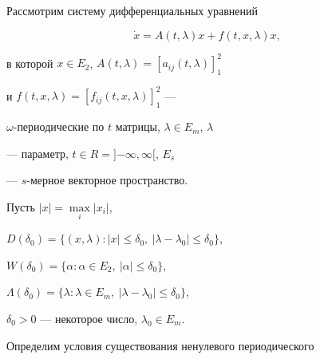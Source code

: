 \date{}




\pagestyle{plain} %







\maketitle


\label{begin}








Рассмотрим систему дифференциальных уравнений


\begin{equation}


\label{1}


\Dot x=A(t,\lambda)x+f(t,x,\lambda)x,


\end{equation}


в которой $x \in E_2$, $A(t,\lambda)


=\left[{a_{ij} (t,\lambda)} \right]_1^2$


и $f(t,x,\lambda)=\left[{f_{ij} (t,x,\lambda)} \right]_1^2$ ---


$\omega$-периодические по $t$ матрицы, $\lambda \in E_m$, $\lambda$


--- параметр, $t \in R=] {- \infty,\infty} [$, $E_s$


--- $s$-мерное векторное пространство.





Пусть $| x|=\max \limits_i | {x_i}|$,


$D(\delta_0)=\{(x,\lambda):|x| \le


\delta_0,\ |\lambda - \lambda_0 | \le \delta_0 \}$,


$W(\delta_0)=\{\alpha :\alpha \in E_2,\ |\alpha | \le \delta_0 \}$,


$\Lambda (\delta_0)=\{\lambda :\lambda


\in E_m,\ |\lambda - \lambda_0 | \le \delta_0\}$,


$\delta_0 >0$ --- некоторое число, $\lambda_0 \in E_m$.





Определим условия существования ненулевого периодического



